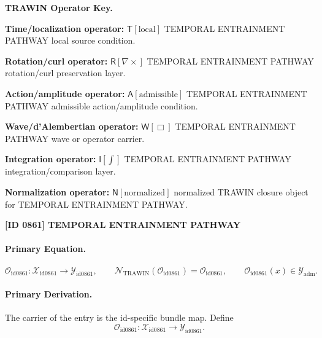 \par\vspace{0.45\baselineskip}
\noindent\begin{minipage}[t]{\linewidth}
\begingroup
\small
\raggedright
\textbf{TRAWIN Operator Key.}\par
\noindent\textbf{Time/localization operator:} $\mathsf{T}\!\left[\mathrm{local}\right]$ TEMPORAL ENTRAINMENT PATHWAY local source condition.\par
\noindent\textbf{Rotation/curl operator:} $\mathsf{R}\!\left[\nabla\times\right]$ TEMPORAL ENTRAINMENT PATHWAY rotation/curl preservation layer.\par
\noindent\textbf{Action/amplitude operator:} $\mathsf{A}\!\left[\mathrm{admissible}\right]$ TEMPORAL ENTRAINMENT PATHWAY admissible action/amplitude condition.\par
\noindent\textbf{Wave/d'Alembertian operator:} $\mathsf{W}\!\left[\Box\right]$ TEMPORAL ENTRAINMENT PATHWAY wave or operator carrier.\par
\noindent\textbf{Integration operator:} $\mathsf{I}\!\left[\int\right]$ TEMPORAL ENTRAINMENT PATHWAY integration/comparison layer.\par
\noindent\textbf{Normalization operator:} $\mathsf{N}\!\left[\mathrm{normalized}\right]$ normalized TRAWIN closure object for TEMPORAL ENTRAINMENT PATHWAY.\par
\endgroup
\end{minipage}

\clearpage
\noindent\textbf{[ID 0861] TEMPORAL ENTRAINMENT PATHWAY}\par
\vspace{0.35em}
\paragraph{Primary Equation.}
\[
\mathcal{O}_{\mathrm{id0861}}:\mathcal{X}_{\mathrm{id0861}}\longrightarrow \mathcal{Y}_{\mathrm{id0861}},\qquad
\mathcal{N}_{\mathrm{TRAWIN}}(\mathcal{O}_{\mathrm{id0861}})=\mathcal{O}_{\mathrm{id0861}},\qquad
\mathcal{O}_{\mathrm{id0861}}(x)\in\mathcal{Y}_{\mathrm{adm}}.
\]

\paragraph{Primary Derivation.} The carrier of the entry is the id-specific bundle map.  Define\[
\mathcal{O}_{\mathrm{id0861}}:\mathcal{X}_{\mathrm{id0861}}\longrightarrow \mathcal{Y}_{\mathrm{id0861}}.
\]

